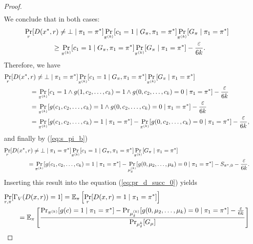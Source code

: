 \begin{proof}
\begin{align}
\end{align}
We conclude that in both cases:
\begin{align}
  &\underset{r}{\Pr}[D(x^*,r) \neq \bot \mid \pi_1 = \pi^*]
  \underset{\pi^{(k)}}{\Pr}[c_1 = 1 \mid G_{\pi}, \pi_1 = \pi^*]
  \underset{\pi^{(k)}}{\Pr}[G_{\pi} \mid \pi_1 = \pi^*] \notag\\
  &\mbox\qquad\qquad \geq \underset{\pi^{(k)}}{\Pr}[c_1 = 1 \mid G_{\pi}, \pi_1 = \pi^*]\underset{\pi^{(k)}}{\Pr}[G_{\pi} \mid \pi_1 = \pi^*] - \frac{\varepsilon}{6k}.
\end{align}
Therefore, we have
\begin{align*}
  &\underset{r}{\Pr}[D(x^*,r) \neq \bot \mid \pi_1 = \pi^*]
  \underset{\pi^{(k)}}{\Pr}[c_1 = 1 \mid G_{\pi}, \pi_1 = \pi^*]
  \underset{\pi^{(k)}}{\Pr}[G_{\pi} \mid \pi_1 = \pi^*] \notag\\
  &\mbox\qquad\qquad = \underset{\pi^{(k)}}{\Pr}[c_1 = 1 \land g(1, c_2,\dots, c_k) = 1 \land g(0, c_2, \dots, c_k) = 0 \mid \pi_1 = \pi^*] - \frac{\varepsilon}{6k} \\
  &\mbox\qquad\qquad = \underset{\pi^{(k)}}{\Pr}[g(c_1, c_2,\dots, c_k) = 1 \land g(0, c_2, \dots, c_k) = 0 \mid \pi_1 = \pi^*] - \frac{\varepsilon}{6k} \\
  &\mbox\qquad\qquad = \underset{\pi^{(k)}}{\Pr}[g(c_1, c_2,\dots, c_k) = 1 \mid \pi_1 = \pi^*] -  \underset{\pi^{(k)}}{\Pr}[g(0, c_2, \dots, c_k) = 0 \mid \pi_1 = \pi^*] - \frac{\varepsilon}{6k},
\end{align*}
and finally by (\ref{eq:s_pi_b})
\begin{align}
  &\underset{r}{\Pr}[D(x^*,r) \neq \bot \mid \pi_1 = \pi^*]
  \underset{\pi^{(k)}}{\Pr}[c_1 = 1 \mid G_{\pi}, \pi_1 = \pi^*]
  \underset{\pi^{(k)}}{\Pr}[G_{\pi} \mid \pi_1 = \pi^*] \notag\\
  &\mbox\qquad\qquad = \underset{\pi^{(k)}}{\Pr}[g(c_1, c_2,\dots, c_k) = 1 \mid \pi_1 = \pi^*] -  \underset{\mu_{\delta}^{(k)}}{\Pr}[g(0, \mu_2, \dots, \mu_k) = 0 \mid \pi_1 = \pi^*]  - S_{\pi^*,0} - \frac{\varepsilon}{6k}.
\end{align}
Inserting this result into the equation (\ref{eq:pr_d_succ_0}) yields
\begin{align}
\label{eq:pr_d_succ_1}
  &\underset{r,\pi}{\Pr}[\Gamma_V(D(x,r)) = 1] = \mathbb{E_{\pi}}\left[\underset{r}{\Pr}[D(x,r) = 1 \mid \pi_1 = \pi^*]\right] \notag\\
&\IndI = \mathbb{E}_{\pi}\left[\frac{{\Pr}_{\pi^{(k)}}[g(c) = 1 \mid \pi_1 = \pi^*] -
{\Pr}_{\mu_{\delta}^{(k)}}[g(0, \mu_2, \dots, \mu_k) = 0 \mid \pi_1 = \pi^*] - \frac{\epsilon}{6k}} {{\Pr}_{\mu_{\delta}^{k}}[G_{\mu}]}\right] \notag\\

\end{align}
\end{proof}
